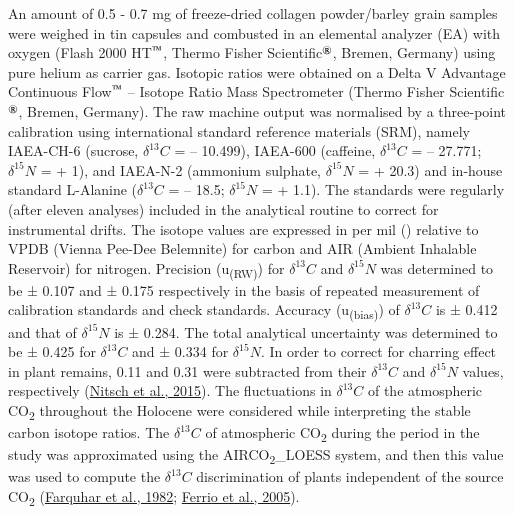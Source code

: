 \documentclass[preprint, 3p, authoryear]{elsarticle} %
\begin{document}
An amount of 0.5 - 0.7 mg of freeze-dried collagen powder/barley grain samples were weighed in tin capsules and combusted in an elemental analyzer (EA) with oxygen (Flash 2000 HT\(^\text{\texttrademark}\), Thermo Fisher Scientific\(^\text{\textregistered}\), Bremen, Germany) using pure helium as carrier gas. Isotopic ratios were obtained on a Delta V Advantage Continuous Flow\(^\text{\texttrademark}\) -- Isotope Ratio Mass Spectrometer (Thermo Fisher Scientific\(^\text{\textregistered}\), Bremen, Germany). The raw machine output was normalised by a three-point calibration using international standard reference materials (SRM), namely IAEA-CH-6 (sucrose, \(\delta ^{13}C\) = -- 10.499\text{\textperthousand}), IAEA-600 (caffeine, \(\delta ^{13}C\) = -- 27.771\text{\textperthousand}; \(\delta ^{15}N\) = + 1\text{\textperthousand}), and IAEA-N-2 (ammonium sulphate, \(\delta ^{15}N\) = + 20.3\text{\textperthousand}) and in-house standard L-Alanine (\(\delta ^{13}C\) = -- 18.5\text{\textperthousand}; \(\delta ^{15}N\) = + 1.1\text{\textperthousand}). The standards were regularly (after eleven analyses) included in the analytical routine to correct for instrumental drifts. The isotope values are expressed in per mil (\text{\textperthousand}) relative to VPDB (Vienna Pee-Dee Belemnite) for carbon and AIR (Ambient Inhalable Reservoir) for nitrogen. Precision (u\textsubscript{(RW)}) for \(\delta ^{13}C\) and \(\delta ^{15}N\) was determined to be ± 0.107 and ± 0.175 respectively in the basis of repeated measurement of calibration standards and check standards. Accuracy (u\textsubscript{(bias)}) of \(\delta ^{13}C\) is ± 0.412 and that of \(\delta ^{15}N\) is ± 0.284. The total analytical uncertainty was determined to be ± 0.425 for \(\delta ^{13}C\) and ± 0.334 for \(\delta ^{15}N\). In order to correct for charring effect in plant remains, 0.11\text{\textperthousand} and 0.31\text{\textperthousand} were subtracted from their \(\delta ^{13}C\) and \(\delta ^{15}N\) values, respectively (\protect\hyperlink{ref-nitsch_etal15}{Nitsch et al., 2015}). The fluctuations in \(\delta ^{13}C\) of the atmospheric CO\textsubscript{2} throughout the Holocene were considered while interpreting the stable carbon isotope ratios. The \(\delta ^{13}C\) of atmospheric CO\textsubscript{2} during the period in the study was approximated using the AIRCO\textsubscript{2}\_LOESS system, and then this value was used to compute the \(\delta ^{13}C\) discrimination of plants independent of the source CO\textsubscript{2} (\protect\hyperlink{ref-farquhar_etal82}{Farquhar et al., 1982}; \protect\hyperlink{ref-ferrio_etal05}{Ferrio et al., 2005}).
\end{document}
